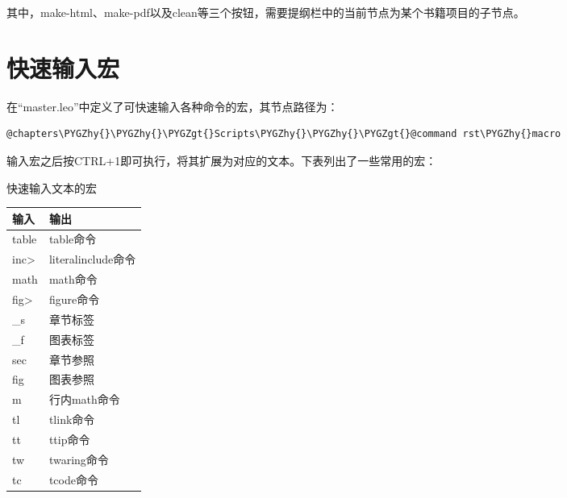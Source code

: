 \documentclass[letterpaper,10pt]{sphinxmanual}
\def\PYGZgt{\char`\>}
\def\PYGZhy{\char`\-}
\begin{document}
其中，make-html、make-pdf以及clean等三个按钮，需要提纲栏中的当前节点为某个书籍项目的子节点。


\section{快速输入宏}
\label{leo:id2}
在“master.leo”中定义了可快速输入各种命令的宏，其节点路径为：

\begin{Verbatim}[commandchars=\\\{\}]
@chapters\PYGZhy{}\PYGZhy{}\PYGZgt{}Scripts\PYGZhy{}\PYGZhy{}\PYGZgt{}@command rst\PYGZhy{}macro
\end{Verbatim}

输入宏之后按CTRL+1即可执行，将其扩展为对应的文本。下表列出了一些常用的宏：


\begin{threeparttable}
\capstart\caption{快速输入文本的宏}

\begin{tabulary}{\linewidth}{|L|L|}
\hline
\textbf{
输入
} & \textbf{
输出
}\\\hline

table
 & 
table命令
\\\hline

inc\textgreater{}
 & 
literalinclude命令
\\\hline

math
 & 
math命令
\\\hline

fig\textgreater{}
 & 
figure命令
\\\hline

\_s
 & 
章节标签
\\\hline

\_f
 & 
图表标签
\\\hline

sec
 & 
章节参照
\\\hline

fig
 & 
图表参照
\\\hline

m
 & 
行内math命令
\\\hline

tl
 & 
tlink命令
\\\hline

tt
 & 
ttip命令
\\\hline

tw
 & 
twaring命令
\\\hline

tc
 & 
tcode命令
\\\hline


\end{tabulary}
\end{threeparttable}
\end{document}

